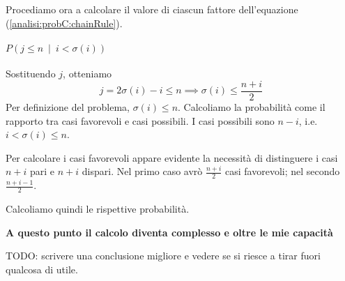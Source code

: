 \documentclass[../../../relazione.tex]{subfiles}
\begin{document}
Procediamo ora a calcolare il valore di ciascun fattore dell'equazione (\ref{analisi:probC:chainRule}).
\paragraph{$P(j \leq n\ \mid\ i < \sigma(i))$}
Sostituendo $j$, otteniamo
$$j = 2\sigma(i) - i \leq n \implies \sigma(i) \leq \frac{n+i}{2}$$
Per definizione del problema, $\sigma(i) \leq n$.
Calcoliamo la probabilità come il rapporto tra casi favorevoli e casi possibili.
I casi possibili sono $n-i$, i.e. $i < \sigma(i) \leq n$.

Per calcolare i casi favorevoli appare evidente la necessità di distinguere i casi $n+i$ pari e $n+i$ dispari.
Nel primo caso avrò $\frac{n+i}{2}$ casi favorevoli; nel secondo $\frac{n+i-1}{2}$.

Calcoliamo quindi le rispettive probabilità.

\dotfill

{\large\textbf{A questo punto il calcolo diventa complesso e oltre le mie capacità}}

\dotfill

TODO: scrivere una conclusione migliore e vedere se si riesce a tirar fuori qualcosa di utile.
\end{document}
